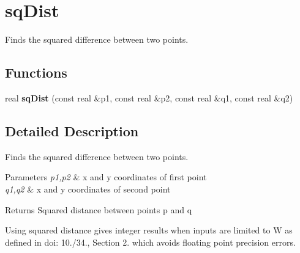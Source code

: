 \hypertarget{group__sqDist}{}\section{sq\+Dist}
\label{group__sqDist}


Finds the squared difference between two points.  


\subsection*{Functions}
\begin{DoxyCompactItemize}
\item 
\mbox{\label{group__sqDist_ga18d0a77f62f604bf2ba74500658add69}} 
real {\bfseries sq\+Dist} (const real \&p1, const real \&p2, const real \&q1, const real \&q2)
\end{DoxyCompactItemize}


\subsection{Detailed Description}
Finds the squared difference between two points. 


\begin{DoxyParams}{Parameters}
{\em p1,p2} & x and y coordinates of first point \\
\hline
{\em q1,q2} & x and y coordinates of second point \\
\hline
\end{DoxyParams}
\begin{DoxyReturn}{Returns}
Squared distance between points p and q
\end{DoxyReturn}
Using squared distance gives integer results when inputs are limited to W as defined in doi\+: 10./34., Section 2. which avoids floating point precision errors. 